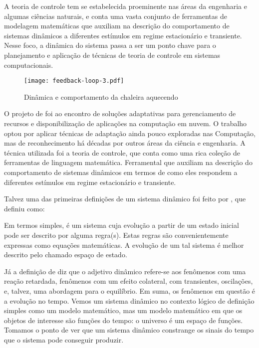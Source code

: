 A teoria de controle tem se estabelecida proeminente nas áreas da engenharia e algumas ciências naturais, e conta uma vasta conjunto de ferramentas de modelagem matemáticas que auxiliam na descrição do comportamento de sistemas dinâmicos a diferentes estímulos em regime estacionário e transiente. Nesse foco, a dinâmica do sistema passa a ser um ponto chave para o planejamento e aplicação de técnicas de teoria de controle em sistemas computacionais. 

\begin{figure}[htb]	
	\centering
	\texttt{[image: feedback-loop-3.pdf]}
	\caption{Dinâmica e comportamento da chaleira aquecendo}
	\label{fig:feedback-nobile}	
\end{figure}

O projeto de  foi ao encontro de soluções adaptativas para gerenciamento de recursos e disponibilização de aplicações na computação em nuvem. O trabalho optou por aplicar técnicas de adaptação ainda pouco exploradas nas Computação, mas de reconhecimento há décadas por outros áreas da ciência e engenharia. A técnica utilizada foi a teoria de controle, que conta como uma rica coleção de ferramentas de linguagem matemática. Ferramental que auxiliam na descrição do comportamento de sistemas dinâmicos em termos de como eles respondem a diferentes estímulos em regime estacionário e transiente.

Talvez uma das primeiras definições de um sistema dinâmico foi feito por \cite{tsonis1989} , que definiu como:
\begin{citacao}
	Em termos simples, é um sistema cuja evolução a partir de um estado inicial pode ser descrito por alguma regra(s). Estas regras são convenientemente expressas como equações matemáticas. A evolução de um tal sistema é melhor descrito pelo chamado espaço de estado.
\end{citacao}

Já a definição de  diz que o adjetivo dinâmico refere-se aos fenômenos com uma reação retardada, fenômenos com um efeito colateral, com transientes, oscilações, e, talvez, uma abordagem para o equilíbrio. Em suma, os fenômenos em questão é a evolução no tempo. Vemos um sistema dinâmico no contexto lógico de definição simples como um modelo matemático, mas um modelo matemático em que os objetos de interesse são funções do tempo: o universo é um espaço de funções. Tomamos o ponto de ver que um sistema dinâmico constrange os sinais do tempo que o sistema pode conseguir produzir.

